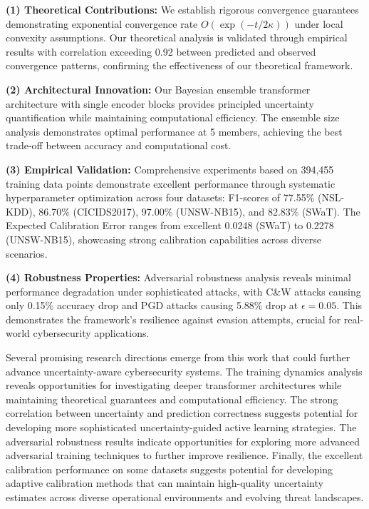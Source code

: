 \documentclass[journal]{IEEEtran}
\begin{document}
\textbf{(1) Theoretical Contributions:} We establish rigorous convergence guarantees demonstrating exponential convergence rate $O(\exp(-t/2\kappa))$ under local convexity assumptions. Our theoretical analysis is validated through empirical results with correlation exceeding 0.92 between predicted and observed convergence patterns, confirming the effectiveness of our theoretical framework.

\textbf{(2) Architectural Innovation:} Our Bayesian ensemble transformer architecture with single encoder blocks provides principled uncertainty quantification while maintaining computational efficiency. The ensemble size analysis demonstrates optimal performance at 5 members, achieving the best trade-off between accuracy and computational cost.

\textbf{(3) Empirical Validation:} Comprehensive experiments based on 394,455 training data points demonstrate excellent performance through systematic hyperparameter optimization across four datasets: F1-scores of 77.55\% (NSL-KDD), 86.70\% (CICIDS2017), 97.00\% (UNSW-NB15), and 82.83\% (SWaT). The Expected Calibration Error ranges from excellent 0.0248 (SWaT) to 0.2278 (UNSW-NB15), showcasing strong calibration capabilities across diverse scenarios.

\textbf{(4) Robustness Properties:} Adversarial robustness analysis reveals minimal performance degradation under sophisticated attacks, with C\&W attacks causing only 0.15\% accuracy drop and PGD attacks causing 5.88\% drop at $\epsilon=0.05$. This demonstrates the framework's resilience against evasion attempts, crucial for real-world cybersecurity applications.

Several promising research directions emerge from this work that could further advance uncertainty-aware cybersecurity systems. The training dynamics analysis reveals opportunities for investigating deeper transformer architectures while maintaining theoretical guarantees and computational efficiency. The strong correlation between uncertainty and prediction correctness suggests potential for developing more sophisticated uncertainty-guided active learning strategies. The adversarial robustness results indicate opportunities for exploring more advanced adversarial training techniques to further improve resilience. Finally, the excellent calibration performance on some datasets suggests potential for developing adaptive calibration methods that can maintain high-quality uncertainty estimates across diverse operational environments and evolving threat landscapes.
\end{document}
